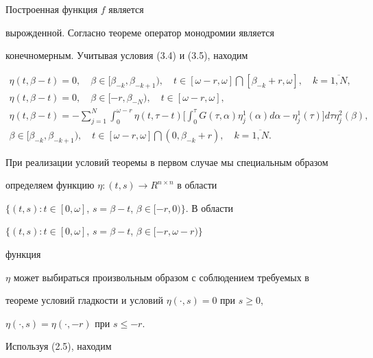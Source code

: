 Построенная функция $f$ является


вырожденной. Согласно теореме оператор монодромии является


конечномерным. Учитывая условия (3.4) и (3.5), находим


\begin{gather*}


\eta(t,\beta-t) =0, \quad \beta \in[\beta_{-k}, \beta_{-k+1}),


\quad t \in[\omega-r, \omega]


\bigcap[\beta_{-k}+r, \omega], \quad k= \overline{1,N}, \\


\eta(t, \beta-t) =0, \quad \beta \in[-r, \beta_{-N}),


\quad t \in[\omega-r, \omega], \\


\eta(t, \beta-t) = -\sum_{j=1}^{N} \int_{0}^{\omega-r} \eta(t, \tau-t)


\bigg[\int_{0}^{\tau}G(\tau, \alpha) \eta_{j}^{1}(\alpha) d \alpha -


\eta_{j}^{1}(\tau)\bigg] d \tau \eta_{j}^{2}(\beta), \\


\beta \in[\beta_{-k}, \beta_{-k+1}), \quad t \in[\omega-r, \omega]


\bigcap(0, \beta_{-k} +r), \quad k= \overline{1,N}.


\end{gather*}





При реализации условий теоремы в первом случае мы специальным образом


определяем функцию $ \eta : (t,s) \rightarrow R^{n \times n}$ в области


$\{(t,s) : t \in[0, \omega]$, $s= \beta-t$, $\beta \in[-r,0) \}$. В области


$\{(t,s) : t \in[0, \omega]$, $s= \beta-t$, $\beta \in[-r, \omega-r) \}$


функция


$\eta$ может выбираться произвольным образом с соблюдением требуемых в


теореме условий гладкости и условий $ \eta(\cdot,s) =0$ при $s \geq 0$,


$\eta(\cdot,s) = \eta(\cdot,-r)$ при $s \leq -r$.





Используя (2.5), находим


